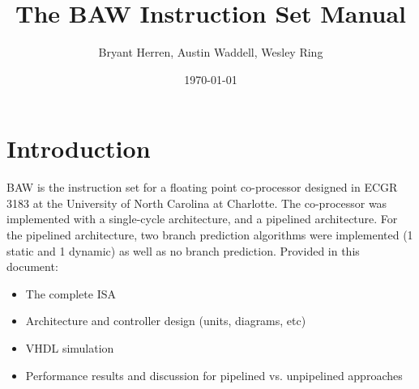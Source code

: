\documentclass[letter,14pt]{article}
\title{The BAW Instruction Set Manual}
\author{Bryant Herren, Austin Waddell, Wesley Ring}
\date{\today}
\begin{document}
\newcommand\DescEntry[1]{%
  \multirow{1}*{%
    \begin{varwidth}{13em}%
    \flushright #1%
    \end{varwidth}}}

\newcommand\Tstrut{\rule{0pt}{2.6ex}}       %
\newcommand\Bstrut{\rule[-0.9ex]{0pt}{0pt}} %
\newcommand{\TBstrut}{\Tstrut\Bstrut} %
    
\null  %
\nointerlineskip  %
\vfill
\let\snewpage \newpage
\let\newpage \relax
\maketitle
\let \newpage \snewpage
\vfill 
\newpage

{\hypersetup{linktoc=all,hidelinks}
\tableofcontents
}
\newpage

\section{Introduction}
BAW is the instruction set for a floating point co-processor designed in ECGR 3183 at the University of North Carolina at Charlotte. The co-processor was implemented with a single-cycle architecture, and a pipelined architecture. For the pipelined architecture, two branch prediction algorithms were implemented (1 static and 1 dynamic) as well as no branch prediction.
\newline\newline
Provided in this document:
\begin{itemize}
    \setlength{\parskip}{0pt}
    \setlength{\itemsep}{0pt plus 1pt}
    \item The complete ISA
    \item Architecture and controller design (units, diagrams, etc)
    \item VHDL simulation
    \item Performance results and discussion for pipelined vs. unpipelined approaches
\end{itemize}
\end{document}
